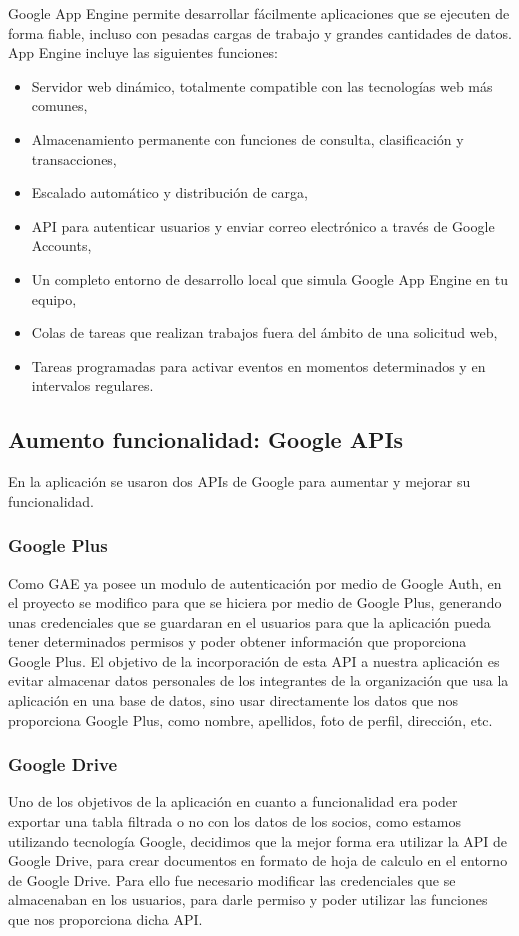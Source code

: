 Google App Engine permite desarrollar fácilmente aplicaciones que se ejecuten de forma fiable, 
incluso con pesadas cargas de trabajo y grandes cantidades de datos. App Engine incluye las siguientes funciones:

\begin{itemize}
  \item Servidor web dinámico, totalmente compatible con las tecnologías web más comunes,
  \item Almacenamiento permanente con funciones de consulta, clasificación y transacciones,
  \item Escalado automático y distribución de carga,
  \item API para autenticar usuarios y enviar correo electrónico a través de Google Accounts,
  \item Un completo entorno de desarrollo local que simula Google App Engine en tu equipo,
  \item Colas de tareas que realizan trabajos fuera del ámbito de una solicitud web,
  \item Tareas programadas para activar eventos en momentos determinados y en intervalos regulares.
\end{itemize}

\subsection{Aumento funcionalidad: Google APIs}


En la aplicación se usaron dos APIs de Google para aumentar y mejorar su funcionalidad. 


\subsubsection{Google Plus}
Como GAE ya posee un modulo de autenticación por medio de Google Auth,
en el proyecto se modifico para que se hiciera por medio de Google Plus, generando unas credenciales que se guardaran en el usuarios
para que la aplicación pueda tener determinados permisos y poder obtener información que proporciona Google Plus. El objetivo de la incorporación de esta 
API a nuestra aplicación es evitar almacenar datos personales de los integrantes de la organización que usa la aplicación en una base de datos, sino usar directamente los
datos que nos proporciona Google Plus, como nombre, apellidos, foto de perfil, dirección, etc.

\subsubsection{Google Drive}
Uno de los objetivos de la aplicación en cuanto a funcionalidad era poder exportar una tabla filtrada o no con los datos de los socios, como estamos utilizando tecnología Google,
decidimos que la mejor forma era utilizar la API de Google Drive, para crear documentos en formato de hoja de calculo en el entorno de Google Drive. Para ello fue necesario
modificar las credenciales que se almacenaban en los usuarios, para darle permiso y poder utilizar las funciones que nos proporciona dicha API.

